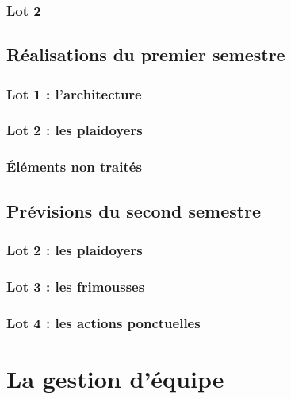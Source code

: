 \documentclass[asi]{picInsa}
\begin{document}
\subsection{Lot 2}


\section{Réalisations du premier semestre}
\subsection{Lot 1 : l'architecture}


\subsection{Lot 2 : les plaidoyers}


\subsection{Éléments non traités}


\section{Prévisions du second semestre}

\subsection{Lot 2 : les plaidoyers}


\subsection{Lot 3 : les frimousses}


\subsection{Lot 4 : les actions ponctuelles}






\chapter{La gestion d'équipe}
\label{gestion_equipe}

 
\begin{appendix}
\listoffigures
{}
	 
\listoftables
{}
\end{appendix}
\pageQuatriemeCouverture
\end{document}
